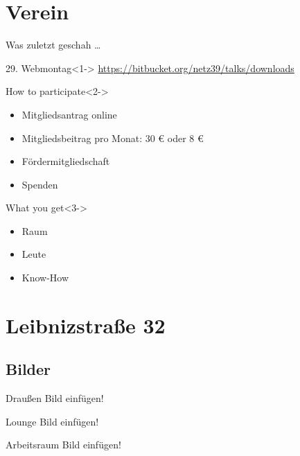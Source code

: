 \documentclass[hyperref={pdfpagelabels=false}]{beamer}
\begin{document}
\section{Verein}

\begin{frame}[label=secbaellebad]{Was zuletzt geschah …}
    \begin{block}{29. Webmontag}<1->
        \url{https://bitbucket.org/netz39/talks/downloads}
    \end{block}
    \begin{block}{How to participate}<2->
        \begin{itemize}
            \item Mitgliedsantrag online
            \item Mitgliedsbeitrag pro Monat: 30 € oder 8 €
            \pause
            \item Fördermitgliedschaft
            \item Spenden
        \end{itemize}
    \end{block}
    \begin{block}{What you get}<3->
        \begin{itemize}
            \item Raum
            \item Leute
            \item Know-How
        \end{itemize}
    \end{block}
\end{frame}

\section{Leibnizstraße 32}

\subsection{Bilder}

\begin{frame}{Draußen}
    Bild einfügen!
\end{frame}

\begin{frame}{Lounge}
    Bild einfügen!
\end{frame}

\begin{frame}{Arbeitsraum}
    Bild einfügen!
\end{frame}
\end{document}
